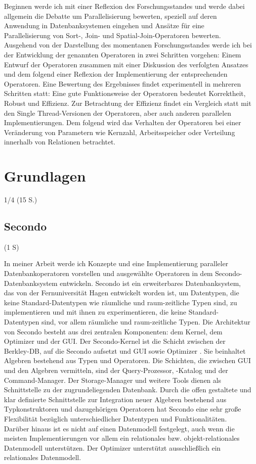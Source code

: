\documentclass[a4paper,12pt,twoside]{article}
\begin{document}
Beginnen werde ich mit einer Reflexion des Forschungsstandes und werde dabei allgemein die Debatte um Parallelisierung bewerten, speziell auf deren Anwendung in Datenbanksystemen eingehen und Ansätze für eine Parallelisierung von Sort-, Join- und Spatial-Join-Operatoren bewerten. Ausgehend von der Darstellung des momentanen Forschungsstandes werde ich bei der Entwicklung der genannten Operatoren in zwei Schritten vorgehen: Einem Entwurf der Operatoren zusammen mit einer Diskussion des verfolgten Ansatzes und dem folgend einer Reflexion der Implementierung der entsprechenden Operatoren. Eine Bewertung des Ergebnisses findet experimentell in mehreren Schritten statt: Eine gute Funktionsweise der Operatoren bedeutet Korrektheit, Robust und Effizienz. Zur Betrachtung der Effizienz findet ein Vergleich statt mit den Single Thread-Versionen der Operatoren, aber auch anderen parallelen Implementierungen. Dem folgend wird das Verhalten der Operatoren bei einer Veränderung von Parametern wie Kernzahl, Arbeitsspeicher oder Verteilung innerhalb von Relationen betrachtet.

\section{Grundlagen}
1/4 (15 S.)

\subsection{Secondo} (1 S)

In meiner Arbeit werde ich Konzepte und eine Implementierung paralleler Datenbankoperatoren vorstellen und ausgewählte Operatoren in dem Secondo-Datenbanksystem entwickeln. Secondo {\autocite{Gueting2010}} ist ein erweiterbares Datenbanksystem, das von der Fernuniversität Hagen entwickelt worden ist, um Datentypen, die keine Standard-Datentypen wie räumliche und raum-zeitliche Typen sind, zu implementieren und mit ihnen zu experimentieren, die keine Standard-Datentypen sind, vor allem räumliche und raum-zeitliche Typen. Die Architektur von Secondo besteht aus drei zentralen Komponenten: dem Kernel, dem Optimizer und der GUI. Der Secondo-Kernel ist die Schicht zwischen der Berkley-DB, auf die Secondo aufsetzt und GUI sowie Optimizer {\autocite{Gueting2017}}. Sie beinhaltet Algebren bestehend aus Typen und Operatoren. Die Schichten, die zwischen GUI und den Algebren vermitteln, sind der Query-Prozessor, -Katalog und der Command-Manager. Der Storage-Manager und weitere Tools dienen als Schnittstelle zu der zugrundeliegenden Datenbank. Durch die offen gestaltete und klar definierte Schnittstelle zur Integration neuer Algebren bestehend aus Typkonstruktoren und dazugehörigen Operatoren hat Secondo eine sehr große Flexibilität bezüglich unterschiedlicher Datentypen und Funktionalitäten. Darüber hinaus ist es nicht auf einen Datenmodell festgelegt, auch wenn die meisten Implementierungen vor allem ein relationales bzw. objekt-relationales Datenmodell unterstützen. Der Optimizer unterstützt ausschließlich ein relationales Datenmodell. 
\end{document}
